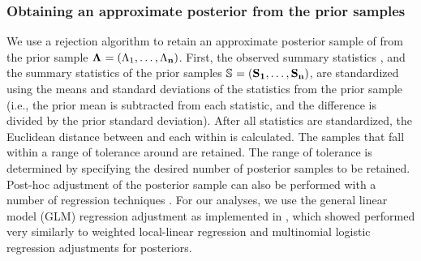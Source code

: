 \subsubsection*{Obtaining an approximate posterior from the prior samples}
We use a rejection algorithm to retain an approximate posterior sample of
\paramSampleVector{} from the prior sample
$\boldsymbol{\Lambda_{}} = (\Lambda_{1}, \ldots, \Lambda_{\mathbf{n}})$.
First, the observed summary statistics \ssVectorObs, and the summary statistics
of the prior samples 
$\ssMatrix = (\ssVector{1}, \ldots, \ssVector{\numPriorSamples})$,
are standardized using the means and standard deviations of the statistics from
the prior sample (i.e., the prior mean is subtracted from each statistic, and the
difference is divided by the prior standard deviation).
After all statistics are standardized, the Euclidean distance between
\ssVectorObs and each \ssVector{} within \ssMatrix is calculated.
The samples that fall within a range of tolerance \tol around \ssVectorObs
are retained.
The range of tolerance is determined by specifying the desired number of
posterior samples to be retained.
Post-hoc adjustment of the posterior sample can also be performed with a number
of regression techniques \citep{Beaumont2002,Blum2009,Leuenberger2010}.
For our analyses, we use the general linear model (GLM) regression adjustment
\citep{Leuenberger2010} as implemented in \abctoolbox
\citep[v1.1;][]{ABCtoolbox}, which \citet{Oaks2012} showed performed very
similarly to weighted local-linear regression and multinomial logistic
regression adjustments \citep{Beaumont2002} for \msb posteriors.


